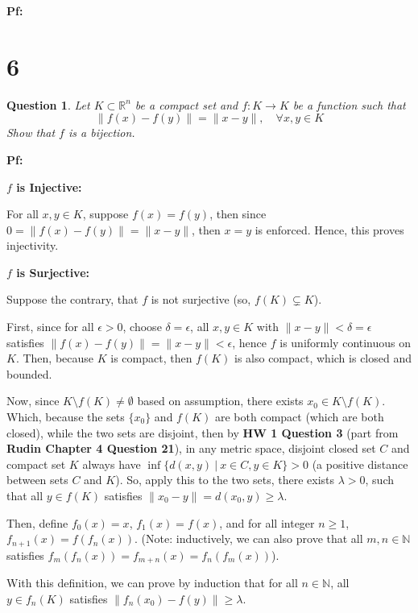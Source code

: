 \documentclass{article}
\newtheorem{question}{Question}
\begin{document}
\textbf{Pf:}

\break

\section*{6}
\begin{myBox}[]{}
    \begin{question}
        Let $K\subset \mathbb{R}^n$
        be a compact set and $f : K \rightarrow K$ be a function such that
        $$\|f(x)-f(y)\|=\|x-y\|,\quad \forall x,y\in K$$
        Show that $f$ is a bijection.
    \end{question}
\end{myBox}

\textbf{Pf:}

\textbf{$f$ is Injective:}

For all $x,y\in K$, suppose $f(x)=f(y)$, then since $0=\|f(x)-f(y)\|=\|x-y\|$, then $x=y$ is enforced. Hence, this proves injectivity.

\hfil

\textbf{$f$ is Surjective:}

Suppose the contrary, that $f$ is not surjective (so, $f(K)\subsetneq K$).

First, since for all $\epsilon>0$, choose $\delta=\epsilon$, all $x,y\in K$ with $\|x-y\|<\delta=\epsilon$ satisfies $\|f(x)-f(y)\|=\|x-y\|<\epsilon$,
hence $f$ is uniformly continuous on $K$. Then, because $K$ is compact, then $f(K)$ is also compact, which is closed and bounded.

Now, since $K\setminus f(K)\neq \emptyset$ based on assumption, there exists $x_0\in K\setminus f(K)$. Which, because the sets $\{x_0\}$ and $f(K)$ are both compact (which are both closed),
while the two sets are disjoint, then by \textbf{HW 1 Question 3} (part from \textbf{Rudin Chapter 4 Question 21}), in any metric space,
disjoint closed set $C$ and compact set $K$ always have $\inf\{d(x,y)\ |\ x\in C,y\in K\}>0$ (a positive distance between sets $C$ and $K$).
So, apply this to the two sets, there exists $\lambda>0$, such that all $y\in f(K)$ satisfies $\|x_0-y\| = d(x_0,y) \geq \lambda$.

\hfil

Then, define $f_0(x)=x$, $f_1(x)=f(x)$, and for all integer $n\geq 1$, $f_{n+1}(x)=f(f_n(x))$. 
(Note: inductively, we can also prove that all $m,n\in\mathbb{N}$ satisfies $f_m(f_n(x))=f_{m+n}(x) = f_n(f_m(x))$).

With this definition, we can prove by induction that for all $n\in\mathbb{N}$,
all $y\in f_{n}(K)$ satisfies $\|f_n(x_0)-f(y)\|\geq \lambda$.
\end{document}
